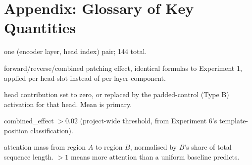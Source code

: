 \documentclass[11pt]{article}
\newcommand{\fwd}{\ensuremath{e^{\mathrm{fwd}}}}
\newcommand{\rev}{\ensuremath{e^{\mathrm{rev}}}}
\newcommand{\comb}{\ensuremath{e^{\mathrm{comb}}}}
\begin{document}
\section*{Appendix: Glossary of Key Quantities}

\begin{description}[leftmargin=1.6em,style=nextline]
  \item[head-slot] one (encoder layer, head index) pair; 144 total.
  \item[$\fwd$ / $\rev$ / $\comb$] forward/reverse/combined patching effect, identical
  formulas to Experiment 1, applied per head-slot instead of per layer-component.
  \item[zero / mean ablation] head contribution set to zero, or replaced by the
  padded-control (Type B) activation for that head. Mean is primary.
  \item[flagged head] combined\_effect $> 0.02$ (project-wide threshold, from
  Experiment 6's template-position classification).
  \item[normalized\_mass$(A\to B)$] attention mass from region $A$ to region $B$,
  normalised by $B$'s share of total sequence length. $>1$ means more attention than a
  uniform baseline predicts.
\end{description}
\end{document}

